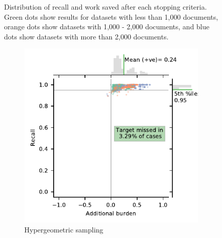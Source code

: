 \documentclass{bmcart}
\begin{document}
\begin{figure}
		\caption{\small Distribution of recall and work saved after each stopping criteria. Green dots show results for datasets with less than 1,000 documents, orange dots show datasets with 1,000 - 2,000 documents, and blue dots show datasets with more than 2,000 documents.} 
		\label{recall-wss}
	\end{figure}
	
	\begin{figure}
		\centering
		\begin{subfigure}[b]{0.475\textwidth}   
			\centering 
			\includegraphics[width=\textwidth]{2_figs_jointplot_burden_hyper.pdf}
			\caption[]%
			{{\small Hypergeometric sampling \\}}    
			\label{fig:hyper_ab}
		\end{subfigure}
		\hfill
		\begin{subfigure}[b]{0.475\textwidth}   
			\centering 

\end{subfigure}
\end{figure}
\end{document}
